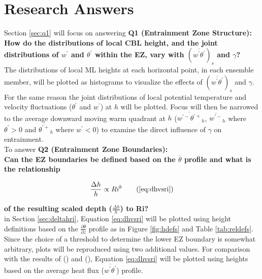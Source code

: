 
\chapter{Research Answers}
\label{ch:results}
\setlength{\parindent}{0cm}

Section \ref{sec:q1} will focus on answering \textbf{Q1 (Entrainment Zone Structure):} \\ 

\textbf{How do the distributions of local \acs{CBL} height, and the joint distributions of $w^{'}$ and $\theta^{'}$ within the \acs{EZ}, vary with $(\overline{w^{'}\theta^{'}})_{s}$ and $\gamma$?}\\

The distributions of local \acs{ML} heights at each horizontal point, in each ensemble member, will be plotted as histograms to visualize the effects of $(\overline{w^{'}\theta^{'}})_{s}$ and $\gamma$.  For the same reason the joint distributions of local potential temperature and velocity fluctuations ($\theta^{'}$ and $w^{'}$) at $h$ will be plotted.  Focus will then be narrowed to the average downward moving warm quadrant at $h$ ($\overline{w^{'-}\theta^{'+}}_{h}$, $\overline{w^{'-}}_{h}$  where $ \theta^{'} >0$ and $\overline{\theta^{'+}}_{h} $ where $ w^{'} < 0 $) to examine the direct influence of $\gamma$ on entrainment.\\       

To answer \textbf{Q2 (Entrainment Zone Boundaries):}\\ 

\textbf{Can the \acs{EZ} boundaries be defined based on the $\overline{\theta}$ profile and what is the relationship} 

\begin{equation}
\frac{\Delta h}{h} \propto Ri^{b}\tag{\ref{eq:dhvsri}}
\end{equation}

\textbf{of the resulting scaled depth ($\frac{\Delta h}{h}$) to \acs{Ri}?}\\

in Section \ref{sec:deltahri}, Equation \ref{eq:dhvsri} will be plotted using height definitions based on the $\frac{\partial \overline{\theta}}{\partial z}$ profile as in Figure \ref{fig:hdefs} and Table \ref{tab:reldefs}.  Since the choice of a threshold to determine the lower \acs{EZ} boundary is somewhat arbitrary, plots will be reproduced using two additional values. For comparison with the results of \citeauthor{FedConzMir04} (\citeyear{FedConzMir04}) and \citeauthor{BrooksFowler2} (\citeyear{BrooksFowler2}), Equation \ref{eq:dhvsri} will be plotted using heights based on the average heat flux ($\overline{w^{'}\theta^{'}}$) profile.\\   


